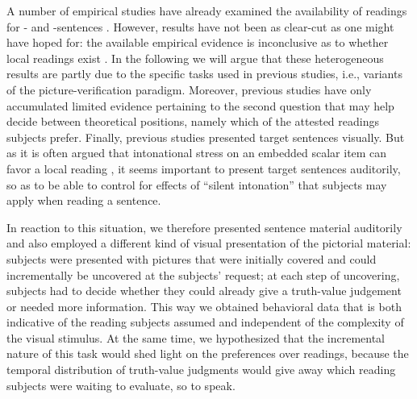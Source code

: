 \documentclass[fleqn,reqno,10pt,draft]{article}
\newcommand{\as}{\acro{as}}
\renewcommand{\es}{\acro{es}}
\begin{document}
A number of empirical studies have already examined the availability
of readings for \as- and \es-sentences
\citep[e.g.][]{GeurtsPouscoulous2009:Embedded-Implic,CliftonDube2010:Embedded-Implic,ChemlaSpector2010:Experimental-Ev}. However,
results have not been as clear-cut as one might have hoped for: the
available empirical evidence is inconclusive as to whether local
readings exist \citep[see also][for related
discussion]{Tielvan-Tiel2012:Embedded-Scalar}. In the following we
will argue that these heterogeneous results are partly due to the
specific tasks used in previous studies, i.e., variants of the
picture-verification paradigm.
Moreover, previous studies have only accumulated limited evidence
pertaining to the second question that may help decide between
theoretical positions, namely which of the attested readings subjects
prefer. Finally, previous studies presented target sentences
visually. But as it is often argued that intonational stress on an
embedded scalar item can favor a local reading
\citep[e.g.][]{Horn2006:The-Border-Wars,Geurts2009:Scalar-Implicat,ChemlaSpector2010:Experimental-Ev,Geurts2010:Quantity-Implic,Tielvan-Tiel2012:Embedded-Scalar},
it seems important to present target sentences auditorily, so as to be
able to control for effects of ``silent intonation'' that subjects may
apply when reading a sentence.

In reaction to this situation, we therefore presented sentence
material auditorily and also employed a different kind of visual
presentation of the pictorial material: subjects were presented with
pictures that were initially covered and could incrementally be
uncovered at the subjects' request; at each step of uncovering,
subjects had to decide whether they could already give a truth-value
judgement or needed more information.
This way we obtained behavioral data that is both indicative of the
reading subjects assumed and independent of the complexity of the
visual stimulus. At the same time, we hypothesized that the
incremental nature of this task would shed light on the preferences
over readings, because the temporal distribution of truth-value
judgments would give away which reading subjects were waiting to
evaluate, so to speak.
\end{document}
